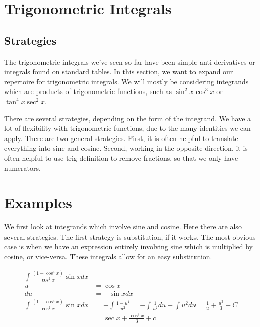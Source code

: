 \documentclass[fleqn]{report}
\begin{document}
\section{Trigonometric Integrals}
\label{trig-integrals}

\subsection{Strategies}
\label{trig-integrals-strategies}

The trigonometric integrals we've seen so far have been simple
anti-derivatives or integrals found on standard tables. In
this section, we want to expand our repertoire for
trigonometric integrals. We will mostly be considering
integrands which are products of trigonometric functions, such
as $\sin^2 x \cos^3 x$ or $\tan^4 x \sec^2 x$. 

There are several strategies, depending on the form of the
integrand. We have a lot of flexibility with trigonometric
functions, due to the many identities we can apply. There are
two general strategies. First, it is often helpful to
translate everything into sine and cosine. Second, working in
the opposite direction, it is often helpful to use trig
definition to remove fractions, so that we only have
numerators.

\section{Examples}
\label{trig-integrals-examples}

We first look at integrands which involve sine and cosine.
Here there are also several strategies. The first strategy is
substitution, if it works. The most obvious case is when we
have an expression entirely involving sine which is multiplied
by cosine, or vice-versa. These integrals allow for an easy
substitution. 

\begin{example}
\begin{align*}
\int \frac{(1-\cos^4 x)}{\cos^2 x} \sin x dx & \\
u & = \cos x \\
du & = - \sin x dx \\
\int \frac{(1-\cos^4 x)}{\cos^2 x} \sin x dx & = - \int
\frac{1-u^4}{u^2} = -\int \frac{1}{u^2} du + \int u^2 du =
\frac{1}{u} + \frac{u^3}{3} + C \\
& = \sec x + \frac{\cos^3 x}{3} + c
\end{align*}
\end{example}
\end{document}
